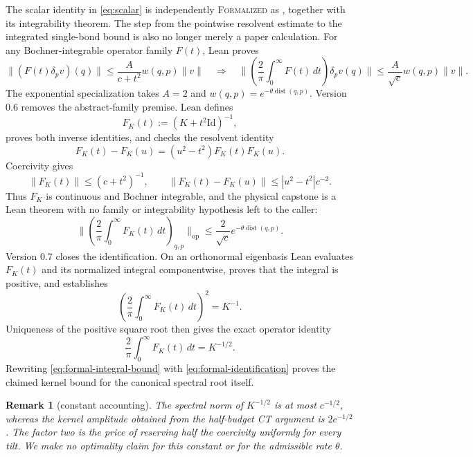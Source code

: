 \documentclass[11pt]{article}
\newtheorem{remark}[theorem]{Remark}
\theoremstyle{definition}
\newcommand{\Id}{\mathrm{Id}}
\newcommand{\dist}{\operatorname{dist}}
\newcommand{\op}{\mathrm{op}}
\newcommand{\norm}[1]{\lVert #1\rVert}
\newcommand{\formalized}{\textsc{Formalized}}
\begin{document}
The scalar identity in \eqref{eq:scalar} is independently \formalized{} as
, together with its integrability theorem.  The
step from the pointwise resolvent estimate to the integrated single-bond bound
is also no longer merely a paper calculation.  For any Bochner-integrable
operator family $F(t)$, Lean proves
\[
  \norm{(F(t)\delta_pv)(q)}
  \le \frac{A}{c+t^2}w(q,p)\norm v
  \quad\Longrightarrow\quad
  \norm{\left(\frac{2}{\pi}\int_0^\infty F(t)\,dt\right)
    \delta_pv(q)}
  \le \frac{A}{\sqrt c}w(q,p)\norm v.
\]
The exponential specialization takes $A=2$ and
$w(q,p)=e^{-\theta\dist(q,p)}$.  Version 0.6 removes the abstract-family
premise.  Lean defines
\[
 F_K(t):=(K+t^2\Id)^{-1},
\]
proves both inverse identities, and checks the resolvent identity
\[
 F_K(t)-F_K(u)=(u^2-t^2)F_K(t)F_K(u).
\]
Coercivity gives
\[
 \norm{F_K(t)}\le(c+t^2)^{-1},\qquad
 \norm{F_K(t)-F_K(u)}\le |u^2-t^2|c^{-2}.
\]
Thus $F_K$ is continuous and Bochner integrable, and the physical capstone is
a Lean theorem with no family or integrability hypothesis left to the caller:
\begin{equation}\label{eq:formal-integral-bound}
 \norm{\left(\frac{2}{\pi}\int_0^\infty F_K(t)\,dt\right)_{q,p}}_{\op}
 \le \frac{2}{\sqrt c}e^{-\theta\dist(q,p)}.
\end{equation}
Version 0.7 closes the identification.  On an orthonormal eigenbasis Lean
evaluates $F_K(t)$ and its normalized integral componentwise, proves that the
integral is positive, and establishes
\begin{equation}\label{eq:formal-square}
 \left(\frac{2}{\pi}\int_0^\infty F_K(t)\,dt\right)^2=K^{-1}.
\end{equation}
Uniqueness of the positive square root then gives the exact operator identity
\begin{equation}\label{eq:formal-identification}
 \frac{2}{\pi}\int_0^\infty F_K(t)\,dt=K^{-1/2}.
\end{equation}
Rewriting \eqref{eq:formal-integral-bound} with
\eqref{eq:formal-identification} proves the claimed kernel bound for the
canonical spectral root itself.

\begin{remark}[constant accounting]
The spectral norm of $K^{-1/2}$ is at most $c^{-1/2}$, whereas the kernel
amplitude obtained from the half-budget CT argument is $2c^{-1/2}$.  The
factor two is the price of reserving half the coercivity uniformly for every
tilt.  We make no optimality claim for this constant or for the admissible
rate $\theta$.
\end{remark}
\end{document}
